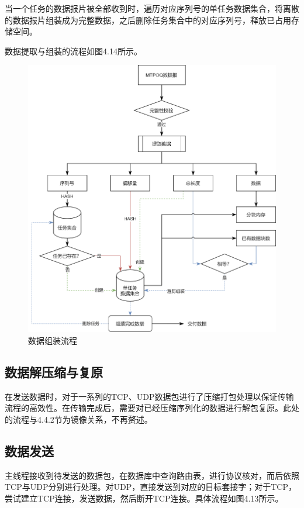 当一个任务的数据报片被全部收到时，遍历对应序列号的单任务数据集合，将离散的数据报片组装成为完整数据，之后删除任务集合中的对应序列号，释放已占用存储空间。

数据提取与组装的流程如图4.14所示。

\begin{figure}[!htbp]
\centering
\includegraphics[scale=1]{figures/Dec_Hs.png}
\caption{数据组装流程}
\end{figure}

\subsection{数据解压缩与复原}

在发送数据时，对于一系列的TCP、UDP数据包进行了压缩打包处理以保证传输流程的高效性。在传输完成后，需要对已经压缩序列化的数据进行解包复原。此处的流程与4.4.2节为镜像关系，不再赘述。

\subsection{数据发送}

主线程接收到待发送的数据包，在数据库中查询路由表，进行协议核对，而后依照TCP与UDP分别进行处理。对UDP，直接发送到对应的目标套接字；对于TCP，尝试建立TCP连接，发送数据，然后断开TCP连接。具体流程如图4.13所示。

